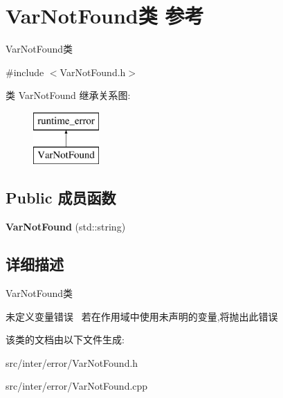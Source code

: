 \hypertarget{class_var_not_found}{}\section{Var\+Not\+Found类 参考}
\label{class_var_not_found}


Var\+Not\+Found类  




{\ttfamily \#include $<$Var\+Not\+Found.\+h$>$}

类 Var\+Not\+Found 继承关系图\+:\begin{figure}[H]
\begin{center}
\leavevmode
\includegraphics[height=2.000000cm]{class_var_not_found}
\end{center}
\end{figure}
\subsection*{Public 成员函数}
\begin{DoxyCompactItemize}
\item 
{\bfseries Var\+Not\+Found} (std\+::string)\hypertarget{class_var_not_found_a36600e0d18a90f6a594cb582940b5bbc}{}\label{class_var_not_found_a36600e0d18a90f6a594cb582940b5bbc}

\end{DoxyCompactItemize}


\subsection{详细描述}
Var\+Not\+Found类 

未定义变量错误~\newline
若在作用域中使用未声明的变量,将抛出此错误 

该类的文档由以下文件生成\+:\begin{DoxyCompactItemize}
\item 
src/inter/error/Var\+Not\+Found.\+h\item 
src/inter/error/Var\+Not\+Found.\+cpp\end{DoxyCompactItemize}
